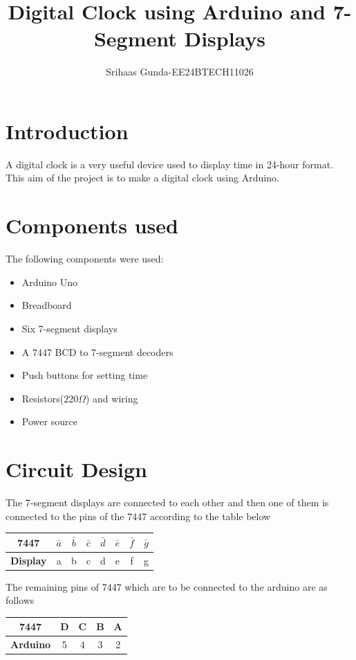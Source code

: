 \documentclass[a4paper,12pt]{article}
\title{Digital Clock using Arduino and 7-Segment Displays}
\author{Srihaas Gunda-EE24BTECH11026}
\date{}
\begin{document}
\maketitle

\tableofcontents  
\newpage  

\section{Introduction}
A digital clock is a very useful device used to display time in 24-hour format. This aim of the project is to make a digital clock using  Arduino.

\section{Components used}
The following components were used:
\begin{itemize}
    \item Arduino Uno
    \item Breadboard
    \item Six 7-segment displays
    \item A 7447 BCD to 7-segment decoders
    \item Push buttons for setting time
    \item Resistors($220 \Omega$) and wiring
    \item Power source
\end{itemize}

\section{Circuit Design}
The 7-segment displays are connected to each other and then one of them is connected to the pins of the 7447 according to  the table below

\begin{table}[h]
    \centering
    \begin{tabular}{|c|c|c|c|c|c|c|c|}
        \hline
        \textbf{7447} & $\bar{a}$ & $\bar{b}$ & $\bar{c}$ & $\bar{d}$ & $\bar{e}$ & $\bar{f}$ & $\bar{g}$ \\ \hline
        \textbf{Display} & a & b & c & d & e & f & g \\ \hline
    \end{tabular}
\end{table}
The remaining pins of 7447 which are to be connected to the arduino are as follows
\begin{table}[h]
    \centering
    \begin{tabular}{|c|c|c|c|c|}
        \hline
        \textbf{7447} & D & C & B & A \\ \hline
        \textbf{Arduino} & 5 & 4 & 3 & 2 \\ \hline
    \end{tabular}
\end{table}
\end{document}
